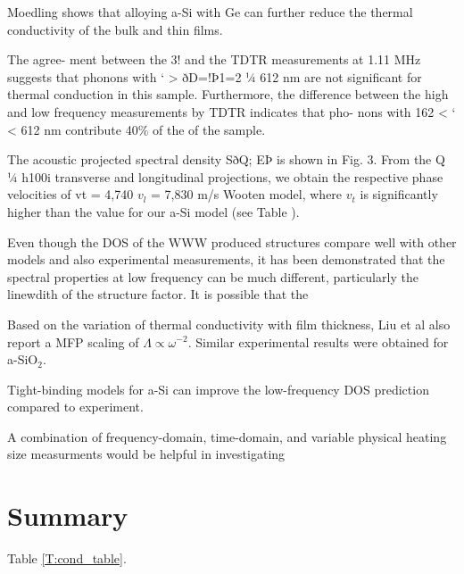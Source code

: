 \documentclass[aps,prb,twocolumn,superscriptaddress,footinbib,amsmath,amssymb,floatfix]{revtex4}
\begin{document}
{Moedling shows that alloying a-Si with Ge can further reduce 
the thermal conductivity of the bulk and thin films.
\cite{bouchard_vibrational_1988,feldman_thermal_1993} 

The agree-
ment between the 3! and the TDTR measurements at
1.11 MHz suggests that phonons with ‘ > ðD=!Þ1=2 1⁄4
612 nm are not significant for thermal conduction in this
sample. Furthermore, the difference between the high and
low frequency measurements by TDTR indicates that pho-
nons with 162 < ‘ < 612 nm contribute 40$\%$ of the of
the sample.\cite{liu_high_2009}

The acoustic projected spectral density SðQ; EÞ is shown
in Fig. 3. From the Q 1⁄4 h100i transverse and longitudinal
projections, we obtain the respective phase velocities of
vt = 4,740 $v_l$ = 7,830 m/s Wooten model, where $v_t$ is 
significantly higher than the value for our a-Si model 
(see Table ).\cite{liu_high_2009} 

Even though the DOS of the WWW produced structures compare well with 
other models and also experimental measurements, it has been 
demonstrated that the spectral properties at low frequency can be 
much different, particularly the linewdith of the structure 
factor.\cite{liu_high_2009} It is possible that the 

Based on the variation of thermal conductivity with film thickness, 
Liu et al also report a MFP scaling of 
$\Lambda \propto \omega^{-2}$.\cite{liu_high_2009} Similar experimental 
results were obtained for a-SiO$_2$.
\cite{masciovecchio_evidence_2006}

Tight-binding models for a-Si can improve the low-frequency 
DOS prediction compared to experiment.\cite{feldman_tight-binding_2004}


A combination of frequency-domain, time-domain, and variable 
physical heating size measurments would be helpful in investigating
\cite{koh_frequency_2007,siemens_quasi-ballistic_2010,
minnich_thermal_2011,regner_broadband_2013}


\section{\label{S:Lifetimes}Summary}

Table \ref{T:cond_table}.

}
\end{document}
